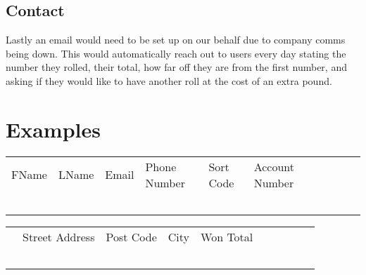\documentclass[12]{article}
\begin{document}
\subsection{Contact}
Lastly an email would need to be set up on our behalf due to company comms being down. This would automatically reach out to users every day stating the number they rolled, their total, how far off they are from the first number, and asking if they would like to have another roll at the cost of an extra pound.

\section{Examples}

\begin{table}[H]
\centering
\begin{tabular}{|l|l|l|l|l|l|llll}
\cline{1-7}
FName & LName & Email & Phone Number & Sort Code & Account Number &  &  &  &  \\ \cline{1-7}
      &       &       &              &           &                &  &  &  &  \\
      &       &       &              &           &                &  &  &  &  \\
      &       &       &              &           &                &  &  &  &  \\
      &       &       &              &           &                &  &  &  &  \\
      &       &       &              &           &                &  &  &  & 
\end{tabular}
\end{table}

\begin{table}[H]
\centering
\begin{tabular}{l|l|l|l|l|lllll}
\cline{1-5}
 & Street Address & Post Code & City & Won Total &  &  &  &  &  \\ \cline{1-5}
 &                &           &      &           &  &  &  &  &  \\
 &                &           &      &           &  &  &  &  &  \\
 &                &           &      &           &  &  &  &  &  \\
 &                &           &      &           &  &  &  &  &  \\
 &                &           &      &           &  &  &  &  & 
\end{tabular}
\end{table}
\end{document}
